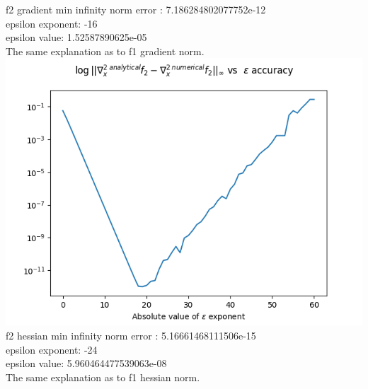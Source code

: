 \documentclass[12pt]{article}
\begin{document}
f2 gradient min infinity norm error : 7.186284802077752e-12\\
epsilon exponent: -16\\
epsilon value: 1.52587890625e-05\\
The same explanation as to f1 gradient norm.\\
\includegraphics[scale=0.7]{f2_hessian_plot}\\
f2 hessian min infinity norm error : 5.16661468111506e-15\\
epsilon exponent: -24\\
epsilon value: 5.960464477539063e-08\\
The same explanation as to f1 hessian norm.
\end{document}
